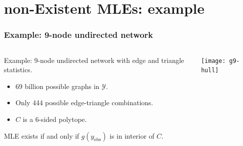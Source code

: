\documentclass[ 10pt]{beamer}
\DeclareMathOperator{\rint}{rint}
\def\YY{{\mathcal Y}}
\newcommand{\yobs}{y_{\text{obs}}}
\begin{document}
\section{non-Existent MLEs: example}
\frame
{
  \frametitle{Example: 9-node undirected network}  

\begin{columns}[T]
\begin{column}[T]{0.4\textwidth}

{
Example: 9-node undirected network with edge and triangle statistics.
\vspace{1mm}

\begin{itemize}
\item 69 billion possible graphs in $\YY$.
\item Only 444 possible edge-triangle combinations.
\item $C$ is a 6-sided polytope.
\end{itemize}
\vspace{2mm}

MLE exists if and only if
$g(\yobs)$ is in interior of $C$.
\vspace{4mm}

}
\end{column}
\begin{column}[T]{0.6\textwidth}
\texttt{[image: g9-hull]}
\end{column}
\end{columns}
}

\end{document}
